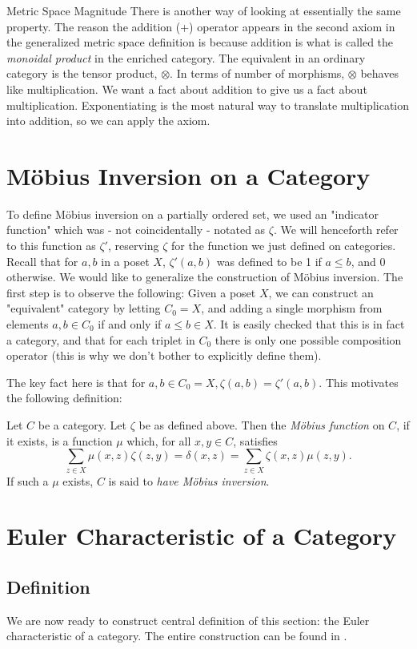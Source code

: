 \documentclass[12pt]{pom_thesis}
\begin{document}
\begin{chapter}{Metric Space Magnitude}
There is another way of looking at essentially the same property. The reason the addition (+) operator appears in the second axiom in the generalized metric space definition is because addition is what is called the \textit{monoidal product} in the enriched category. The equivalent in an ordinary category is the tensor product, $\otimes$. In terms of number of morphisms, $\otimes$ behaves like multiplication. We want a fact about addition to give us a fact about multiplication. Exponentiating is the most natural way to translate multiplication into addition, so we can apply the axiom.
\section{M\"obius Inversion on a Category}
To define M\"obius inversion on a partially ordered set, we used an "indicator function" which was - not coincidentally - notated as $\zeta$. We will henceforth refer to this function as $\zeta'$, reserving $\zeta$ for the function we just defined on categories. Recall that for $a,b$ in a poset $X$, $\zeta'(a,b)$ was defined to be 1 if $a \leq b$, and 0 otherwise. We would like to generalize the construction of M\"obius inversion. The first step is to observe the following: Given a poset $X$, we can construct an "equivalent" category by letting $C_0=X$, and adding a single morphism from elements $a,b \in C_0$ if and only if $a \leq b \in X$. It is easily checked that this is in fact a category, and that for each triplet in $C_0$ there is only one possible composition operator (this is why we don't bother to explicitly define them). 

The key fact here is that for $a,b \in C_0 = X, \zeta(a,b) = \zeta'(a,b)$. This motivates the following definition:
\begin{defn}\label{cat_mob} %
Let $C$ be a category. Let $\zeta$ be as defined above. Then the \emph{M\"obius function} on $C$, if it exists, is a function $\mu$ which, for all $x,y \in C$, satisfies
\[
\sum_{z \in X} \mu(x,z)\zeta(z,y) = \delta(x,z) = \sum_{z \in X} \zeta(x,z)\mu(z,y).
\]
If such a $\mu$ exists, $C$ is said to \emph{have M\"obius inversion}. %
\end{defn}
\section{Euler Characteristic of a Category}
\subsection{Definition}
We are now ready to construct central definition of this section: the Euler characteristic of a category. The entire construction can be found in \cite{Lein1, Lein2, Lein4}. 


\end{chapter}
\end{document}
